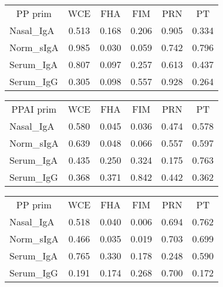 \documentclass[
]{article}
\begin{document}
\begin{tabular}{>{}l|>{}c|>{}c|>{}c|>{}c|c}
\hline
\multicolumn{1}{c|}{PP prim} & \multicolumn{1}{c|}{WCE} & \multicolumn{1}{c|}{FHA} & \multicolumn{1}{c|}{FIM} & \multicolumn{1}{c|}{PRN} & \multicolumn{1}{c}{PT} \\
\cline{1-1} \cline{2-2} \cline{3-3} \cline{4-4} \cline{5-5} \cline{6-6}
Nasal\_IgA & 0.513 & 0.168 & 0.206 & 0.905 & 0.334\\
\hline
Norm\_sIgA & 0.985 & 0.030 & 0.059 & 0.742 & 0.796\\
\hline
Serum\_IgA & 0.807 & 0.097 & 0.257 & 0.613 & 0.437\\
\hline
Serum\_IgG & 0.305 & 0.098 & 0.557 & 0.928 & 0.264\\
\hline
\end{tabular}

\begin{tabular}{>{}l|>{}c|>{}c|>{}c|>{}c|c}
\hline
\multicolumn{1}{c|}{PPAI prim} & \multicolumn{1}{c|}{WCE} & \multicolumn{1}{c|}{FHA} & \multicolumn{1}{c|}{FIM} & \multicolumn{1}{c|}{PRN} & \multicolumn{1}{c}{PT} \\
\cline{1-1} \cline{2-2} \cline{3-3} \cline{4-4} \cline{5-5} \cline{6-6}
Nasal\_IgA & 0.580 & 0.045 & 0.036 & 0.474 & 0.578\\
\hline
Norm\_sIgA & 0.639 & 0.048 & 0.066 & 0.557 & 0.597\\
\hline
Serum\_IgA & 0.435 & 0.250 & 0.324 & 0.175 & 0.763\\
\hline
Serum\_IgG & 0.368 & 0.371 & 0.842 & 0.442 & 0.362\\
\hline
\end{tabular}

\begin{tabular}{>{}l|>{}c|>{}c|>{}c|>{}c|c}
\hline
\multicolumn{1}{c|}{PP prim} & \multicolumn{1}{c|}{WCE} & \multicolumn{1}{c|}{FHA} & \multicolumn{1}{c|}{FIM} & \multicolumn{1}{c|}{PRN} & \multicolumn{1}{c}{PT} \\
\cline{1-1} \cline{2-2} \cline{3-3} \cline{4-4} \cline{5-5} \cline{6-6}
Nasal\_IgA & 0.518 & 0.040 & 0.006 & 0.694 & 0.762\\
\hline
Norm\_sIgA & 0.466 & 0.035 & 0.019 & 0.703 & 0.699\\
\hline
Serum\_IgA & 0.765 & 0.330 & 0.178 & 0.248 & 0.590\\
\hline
Serum\_IgG & 0.191 & 0.174 & 0.268 & 0.700 & 0.172\\
\hline
\end{tabular}
\end{document}
